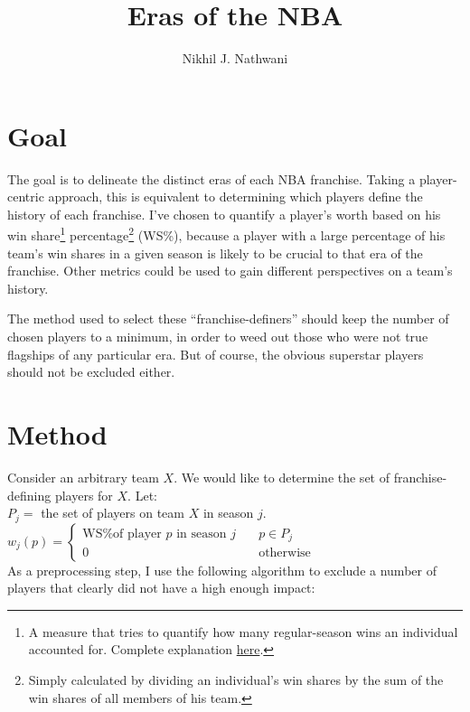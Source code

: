 \documentclass[a4paper,11pt]{article}
\author{Nikhil J. Nathwani}
\title{Eras of the NBA}
\begin{document}
       \maketitle

\section{Goal}
The goal is to delineate the distinct eras of each NBA franchise. Taking a player-centric approach, this is equivalent to determining which players define the history of each franchise. I've chosen to quantify a player's worth based on his win share\footnote{A measure that tries to quantify how many regular-season wins an individual accounted for. Complete explanation \href{http://www.basketball-reference.com/about/ws.html}{here}.} percentage\footnote{Simply calculated by dividing an individual's win shares by the sum of the win shares of all members of his team.} (WS\%), because a player with a large percentage of his team's win shares in a given season is likely to be crucial to that era of the franchise. Other metrics could be used to gain different perspectives on a team's history.

The method used to select these ``franchise-definers'' should keep the number of chosen players to a minimum, in order to weed out those who were not true flagships of any particular era. But of course, the obvious superstar players should not be excluded either.

\section{Method}
Consider an arbitrary team $X$. We would like to determine the set of franchise-defining players for $X$. Let:\\

$P_j=$ the set of players on team $X$ in season $j$.\\ 


$w_j(p) = \left\{ \begin{array}{ll}
		            \text{WS\% of player } p \text{ in season } j & \quad p \in P_j\\
		            0 & \quad \text{otherwise}
		        \end{array}
 		   \right. $\\



As a preprocessing step, I use the following algorithm to exclude a number of players that clearly did not have a high enough impact:\\
\end{document}
